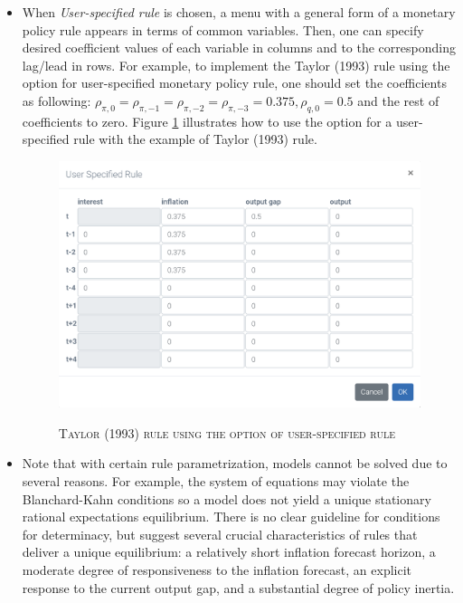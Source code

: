 \begin{itemize}
  \item When \textit{User-specified rule} is chosen, a menu with a general form of a monetary policy rule appears in terms of common variables. Then, one can specify desired coefficient values of each variable in columns and to the corresponding lag/lead in rows.
      For example, to implement the Taylor (1993) rule using the option for user-specified monetary policy rule, one should set the coefficients as following: $ \rho_{\pi,0} = \rho_{\pi,-1} = \rho_{\pi,-2} = \rho_{\pi,-3} = 0.375, \rho_{q,0} = 0.5 $ and the rest of coefficients to zero. Figure \ref{img:userruletaylor} illustrates how to use the option for a user-specified rule with the example of Taylor (1993) rule. \\

        \begin{figure}[H]
        \centering
        \caption{\textsc{Taylor (1993) rule using the option of user-specified rule }}
        \vspace{0.2cm}
        \includegraphics[width=13cm,keepaspectratio]{userrule.png}
        \label{img:userruletaylor}
        \end{figure}

  \item Note that with certain rule parametrization, models cannot be solved due to several reasons. For example, the system of equations may violate the Blanchard-Kahn conditions so a model does not yield a unique stationary rational expectations equilibrium. There is no clear guideline for conditions for determinacy, but \cite{LevinWielandWilliams2003} suggest several crucial characteristics of rules that deliver a unique equilibrium: a relatively short inflation forecast horizon, a moderate degree of responsiveness to the inflation forecast, an explicit response to the current output gap, and a substantial degree of policy inertia.
\end{itemize}

